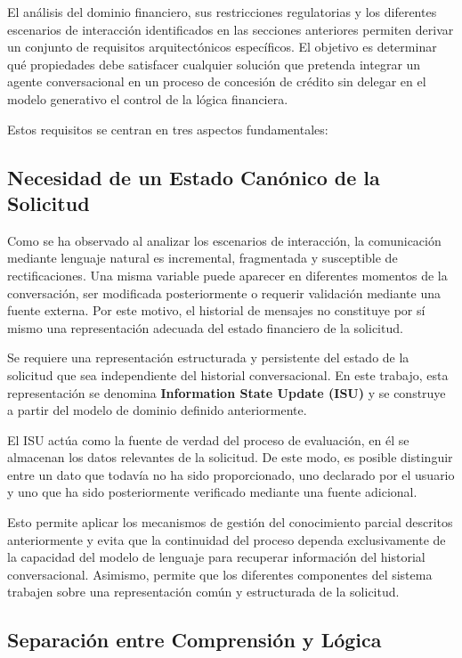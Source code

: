 \documentclass[12pt,a4paper]{report}
\begin{document}
El análisis del dominio financiero, sus restricciones regulatorias y los diferentes escenarios de interacción identificados en las secciones anteriores permiten derivar un conjunto de requisitos arquitectónicos específicos. El objetivo es determinar qué propiedades debe satisfacer cualquier solución que pretenda integrar un agente conversacional en un proceso de concesión de crédito sin delegar en el modelo generativo el control de la lógica financiera.

Estos requisitos se centran en tres aspectos fundamentales:

\subsection{Necesidad de un Estado Canónico de la Solicitud}

Como se ha observado al analizar los escenarios de interacción, la comunicación mediante lenguaje natural es incremental, fragmentada y susceptible de rectificaciones. Una misma variable puede aparecer en diferentes momentos de la conversación, ser modificada posteriormente o requerir validación mediante una fuente externa. Por este motivo, el historial de mensajes no constituye por sí mismo una representación adecuada del estado financiero de la solicitud.

Se requiere una representación estructurada y persistente del estado de la solicitud que sea independiente del historial conversacional. En este trabajo, esta representación se denomina \textbf{Information State Update (ISU)} y se construye a partir del modelo de dominio definido anteriormente.

El ISU actúa como la fuente de verdad del proceso de evaluación, en él se almacenan los datos relevantes de la solicitud. De este modo, es posible distinguir entre un dato que todavía no ha sido proporcionado, uno declarado por el usuario y uno que ha sido posteriormente verificado mediante una fuente adicional.

Esto permite aplicar los mecanismos de gestión del conocimiento parcial descritos anteriormente y evita que la continuidad del proceso dependa exclusivamente de la capacidad del modelo de lenguaje para recuperar información del historial conversacional. Asimismo, permite que los diferentes componentes del sistema trabajen sobre una representación común y estructurada de la solicitud.

\subsection{Separación entre Comprensión y Lógica}
\end{document}
